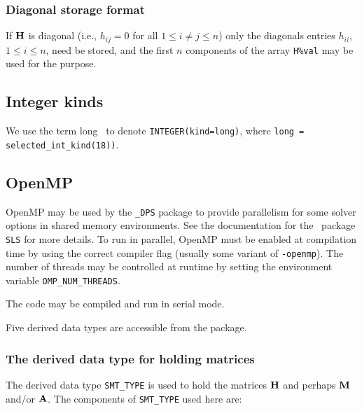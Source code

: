 \documentclass{galahad}
\newcommand{\packagename}{DPS}
\newcommand{\fullpackagename}{\libraryname\_\packagename}
\begin{document}
\subsubsection{Diagonal storage format}\label{diagonal}
If ${\mathbf{H}}$ is diagonal (i.e., $h_{ij} = 0$ for all $1 \leq i \neq j \leq n$)
only the diagonals entries $h_{ii}$, $1 \leq i \leq n$,  need be stored,
and the first $n$ components of the array {\tt H\%val} may be used for
the purpose.

\subsection{Integer kinds}\label{Integer kinds}
We use the term
long \integer\ to denote {\tt INTEGER\-(kind=long)}, where
{\tt long = selected\_int\_kind(18))}.


\subsection{OpenMP}
OpenMP may be used by the {\tt \fullpackagename} package to provide
parallelism for some solver options in shared memory environments.
See the documentation for the \galahad\ package {\tt SLS} for more details.
To run in parallel, OpenMP
must be enabled at compilation time by using the correct compiler flag
(usually some variant of {\tt -openmp}).
The number of threads may be controlled at runtime
by setting the environment variable {\tt OMP\_NUM\_THREADS}.

\noindent
The code may be compiled and run in serial mode.


\galtypes
Five derived data types are accessible from the package.


\subsubsection{The derived data type for holding matrices}\label{typesmt}
The derived data type {\tt SMT\_TYPE} is used to hold the matrices ${\mathbf{H}}$
and perhaps ${\mathbf{M}}$ and/or ${\mathbf{A}}$.
The components of {\tt SMT\_TYPE} used here are:
\end{document}
